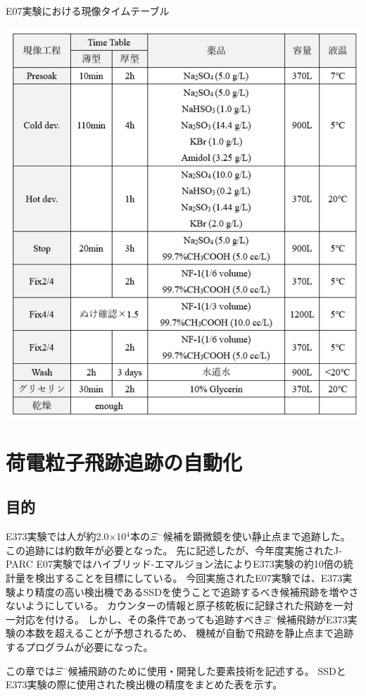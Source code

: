 \documentclass[12pt,a4paper]{jarticle}
\begin{document}
\begin{table}[htbp]
\centering
\caption{E07実験における現像タイムテーブル\label{tab:gennzou_timetable}}
\begin{center}
    \includegraphics[width=150mm]{gennzou_timetable.png}
\end{center}
\end{table}


\newpage
\section{荷電粒子飛跡追跡の自動化}
\subsection{目的}
E373実験では人が約2.0×10$^4$本の$\Xi$$^-$候補を顕微鏡を使い静止点まで追跡した。
この追跡には約数年が必要となった。
先に記述したが、今年度実施されたJ-PARC E07実験ではハイブリッド-エマルジョン法によりE373実験の約10倍の統計量を検出することを目標にしている。
今回実施されたE07実験では、E373実験より精度の高い検出機であるSSDを使うことで追跡するべき候補飛跡を増やさないようにしている。
カウンターの情報と原子核乾板に記録された飛跡を一対一対応を付ける。
しかし、その条件であっても追跡すべき$\Xi$$^-$候補飛跡がE373実験の本数を超えることが予想されるため、
機械が自動で飛跡を静止点まで追跡するプログラムが必要になった。
\par
この章では$\Xi$$^-$候補飛跡のために使用・開発した要素技術を記述する。
SSDとE373実験の際に使用された検出機の精度をまとめた表を示す。
\end{document}
